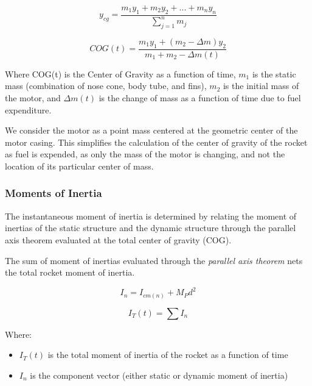 \documentclass[]{article}
\providecommand{\tightlist}{%
  \setlength{\itemsep}{0pt}\setlength{\parskip}{0pt}}
\begin{document}
\begin{equation}
y_{cg} = \dfrac{m_1 y_1 + m_2 y_2 + ... + m_n y_n}{\sum_{j=1}^n m_j}
\end{equation}

\begin{equation}
COG(t) = \dfrac{m_1 y_1 + (m_2 - \Delta m) y_2}{m_1 + m_2 - \Delta m(t)} 
\end{equation}

Where COG(t) is the Center of Gravity as a function of time, \(m_1\) is
the static mass (combination of nose cone, body tube, and fins), \(m_2\)
is the initial mass of the motor, and \(\Delta m(t)\) is the change of
mass as a function of time due to fuel expenditure.

We consider the motor as a point mass centered at the geometric center
of the motor casing. This simplifies the calculation of the center of
gravity of the rocket as fuel is expended, as only the mass of the motor
is changing, and not the location of its particular center of mass.

\subsubsection{Moments of Inertia}\label{moments-of-inertia}

The instantaneous moment of inertia is determined by relating the moment
of inertias of the static structure and the dynamic structure through
the parallel axis theorem evaluated at the total center of gravity
(COG).

The sum of moment of inertias evaluated through the \emph{parallel axis
theorem} nets the total rocket moment of inertia.

\begin{equation}
\label{eq_parallel_axis_theorem}
I_n = I_{cm(n)} + M_P d^2 
\end{equation}

\begin{equation}
I_T(t) = \sum I_n 
\end{equation}

Where:

\begin{itemize}
\tightlist
\item
  \(I_T(t)\) is the total moment of inertia of the rocket as a function
  of time
\item
  \(I_n\) is the component vector (either static or dynamic moment of
  inertia)
\end{itemize}
\end{document}
